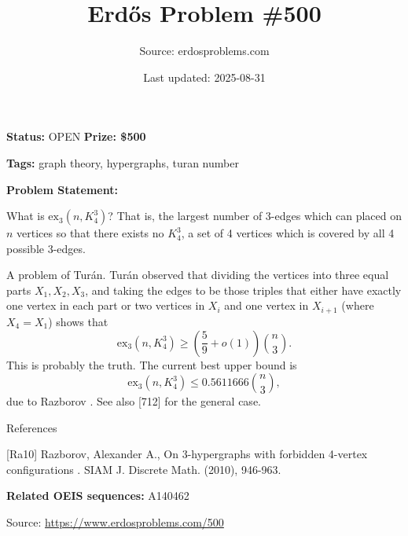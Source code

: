 \documentclass{article}
\title{Erd\H{o}s Problem \#500}
\date{Last updated: 2025-08-31}
\author{Source: erdosproblems.com}
\begin{document}
\maketitle

\noindent\textbf{Status:} OPEN \quad \textbf{Prize: \$500}

\noindent\textbf{Tags:} graph theory, hypergraphs, turan number

\medskip

\noindent\textbf{Problem Statement:}

What is $\mathrm{ex}_3(n,K_4^3)$? That is, the largest number of $3$-edges which can placed on $n$ vertices so that there exists no $K_4^3$, a set of 4 vertices which is covered by all 4 possible $3$-edges.




A problem of Tur\'{a}n. Tur\'{a}n observed that dividing the vertices into three equal parts $X_1,X_2,X_3$, and taking the edges to be those triples that either have exactly one vertex in each part or two vertices in $X_i$ and one vertex in $X_{i+1}$ (where $X_4=X_1$) shows that\[\mathrm{ex}_3(n,K_4^3)\geq\left(\frac{5}{9}+o(1)\right)\binom{n}{3}.\]This is probably the truth. The current best upper bound is\[\mathrm{ex}_3(n,K_4^3)\leq 0.5611666\binom{n}{3},\]due to Razborov \cite{Ra10}. See also [712] for the general case.




References

[Ra10] Razborov, Alexander A., On 3-hypergraphs with forbidden 4-vertex configurations . SIAM J. Discrete Math. (2010), 946-963.

\noindent\textbf{Related OEIS sequences:} A140462


\bigskip
\noindent\small{Source: \url{https://www.erdosproblems.com/500}}
\end{document}
